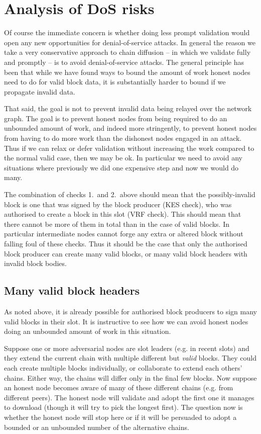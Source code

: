 \documentclass[11pt,a4paper]{article}
\begin{document}
\section{Analysis of DoS risks}

Of course the immediate concern is whether doing less prompt validation would
open any new opportunities for denial-of-service attacks. In general the reason
we take a very conservative approach to chain diffusion -- in which we validate
fully and promptly -- is to avoid denial-of-service attacks. The general
principle has been that while we have found ways to bound the amount of work
honest nodes need to do for valid block data, it is substantially harder to
bound if we propagate invalid data.

That said, the goal is not to prevent invalid data being relayed over the
network graph. The goal is to prevent honest nodes from being required to do an
unbounded amount of work, and indeed more stringently, to prevent honest nodes
from having to do more work than the dishonest nodes engaged in an attack. Thus
if we can relax or defer validation without increasing the work compared to the
normal valid case, then we may be ok. In particular we need to avoid any
situations where previously we did one expensive step and now we would do many.

The combination of checks 1.~and 2.~above should mean that the possibly-invalid
block is one that was signed by the block producer (KES check), who was
authorised to create a block in this slot (VRF check). This should mean that
there cannot be more of them in total than in the case of valid blocks. In
particular intermediate nodes cannot forge any extra or altered block without
falling foul of these checks. Thus it should be the case that only the
authorised block producer can create many valid blocks, or many valid block
headers with invalid block bodies.

\subsection{Many valid block headers}
\label{many-valid-block-headers}

As noted above, it is already possible for authorised block producers to sign
many valid blocks in their slot. It is instructive to see how we can avoid
honest nodes doing an unbounded amount of work in this situation.

Suppose one or more adversarial nodes are slot leaders (e.g. in recent slots)
and they extend the current chain with multiple different but \emph{valid}
blocks. They could each create multiple blocks individually, or collaborate to
extend each others' chains. Either way, the chains will differ only in the final
few blocks. Now suppose an honest node becomes aware of many of these different
chains (e.g. from different peers). The honest node will validate and adopt the
first one it manages to download (though it will try to pick the longest first).
The question now is whether the honest node will stop here or if it will be
persuaded to adopt a bounded or an unbounded number of the alternative chains.
\end{document}
